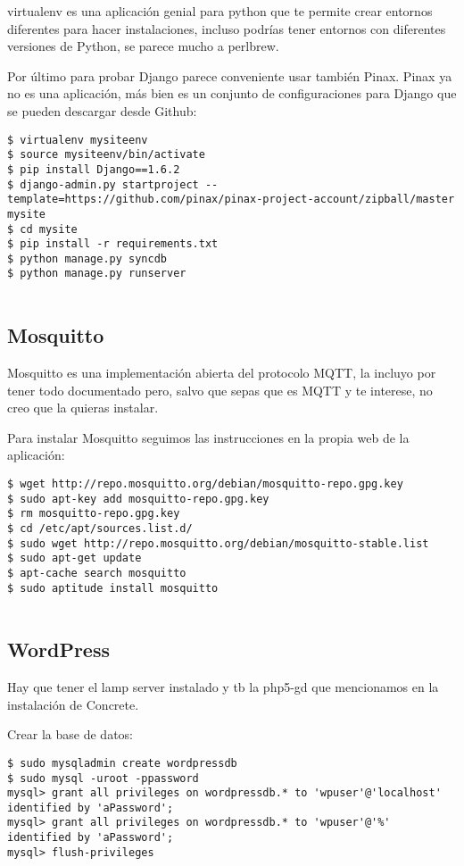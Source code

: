virtualenv es una aplicación genial para python que te permite crear
entornos diferentes para hacer instalaciones, incluso podrías tener
entornos con diferentes versiones de Python, se parece mucho a perlbrew.

Por último para probar Django parece conveniente usar también Pinax.
Pinax ya no es una aplicación, más bien es un conjunto de
configuraciones para Django que se pueden descargar desde Github:

\begin{verbatim}
$ virtualenv mysiteenv
$ source mysiteenv/bin/activate
$ pip install Django==1.6.2
$ django-admin.py startproject --template=https://github.com/pinax/pinax-project-account/zipball/master mysite
$ cd mysite
$ pip install -r requirements.txt
$ python manage.py syncdb
$ python manage.py runserver
      
\end{verbatim}

\subsection{Mosquitto}\label{mosquitto}

Mosquitto es una implementación abierta del protocolo MQTT, la incluyo
por tener todo documentado pero, salvo que sepas que es MQTT y te
interese, no creo que la quieras instalar.

Para instalar Mosquitto seguimos las instrucciones en la propia web de
la aplicación:

\begin{verbatim}
$ wget http://repo.mosquitto.org/debian/mosquitto-repo.gpg.key
$ sudo apt-key add mosquitto-repo.gpg.key
$ rm mosquitto-repo.gpg.key
$ cd /etc/apt/sources.list.d/
$ sudo wget http://repo.mosquitto.org/debian/mosquitto-stable.list
$ sudo apt-get update
$ apt-cache search mosquitto
$ sudo aptitude install mosquitto
      
\end{verbatim}

\subsection{WordPress}\label{wordpress}

Hay que tener el lamp server instalado y tb la php5-gd que mencionamos
en la instalación de Concrete.

Crear la base de datos:

\begin{verbatim}
$ sudo mysqladmin create wordpressdb
$ sudo mysql -uroot -ppassword
mysql> grant all privileges on wordpressdb.* to 'wpuser'@'localhost' identified by 'aPassword';
mysql> grant all privileges on wordpressdb.* to 'wpuser'@'%' identified by 'aPassword';
mysql> flush-privileges
      
\end{verbatim}

